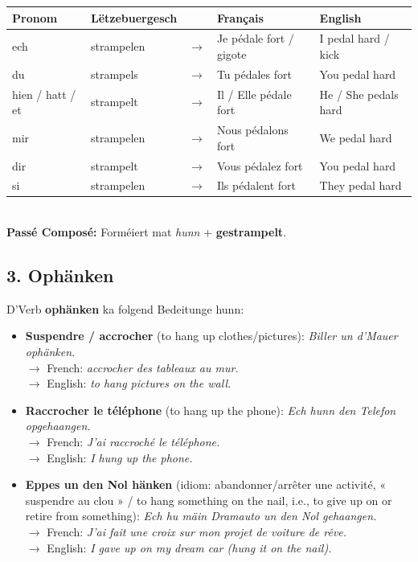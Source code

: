 \begin{tabular}{ll c l l}
    \toprule
    \textbf{Pronom} & \textbf{Lëtzebuergesch} & \textbf{} & \textbf{Français} & \textbf{English} \\
    \midrule
    ech & strampelen & $\rightarrow$ & Je pédale fort / gigote & I pedal hard / kick \\
    du & strampels & $\rightarrow$ & Tu pédales fort & You pedal hard \\
    hien / hatt / et & strampelt & $\rightarrow$ & Il / Elle pédale fort & He / She pedals hard \\
    \midrule
    mir & strampelen & $\rightarrow$ & Nous pédalons fort & We pedal hard \\
    dir & strampelt & $\rightarrow$ & Vous pédalez fort & You pedal hard \\
    si & strampelen & $\rightarrow$ & Ils pédalent fort & They pedal hard \\
    \bottomrule
\end{tabular}
\\[0.5em]
\textbf{Passé Composé:} Forméiert mat \textit{hunn} + \textbf{gestrampelt}.

\subsection*{3. Ophänken}
D'Verb \textbf{ophänken} ka folgend Bedeitunge hunn:
\begin{itemize}
    \item \textbf{Suspendre / accrocher} (to hang up clothes/pictures): \textit{Biller un d'Mauer ophänken.} \\
    $\rightarrow$ French: \textit{accrocher des tableaux au mur.} \\
    $\rightarrow$ English: \textit{to hang pictures on the wall.}
    
    \item \textbf{Raccrocher le téléphone} (to hang up the phone): \textit{Ech hunn den Telefon opgehaangen.} \\
    $\rightarrow$ French: \textit{J'ai raccroché le téléphone.} \\
    $\rightarrow$ English: \textit{I hung up the phone.}
    
    \item \textbf{Eppes un den Nol hänken} (idiom: abandonner/arrêter une activité, « suspendre au clou » / to hang something on the nail, i.e., to give up on or retire from something): \textit{Ech hu mäin Dramauto un den Nol gehaangen.} \\
    $\rightarrow$ French: \textit{J'ai fait une croix sur mon projet de voiture de rêve.} \\
    $\rightarrow$ English: \textit{I gave up on my dream car (hung it on the nail).}
\end{itemize}

